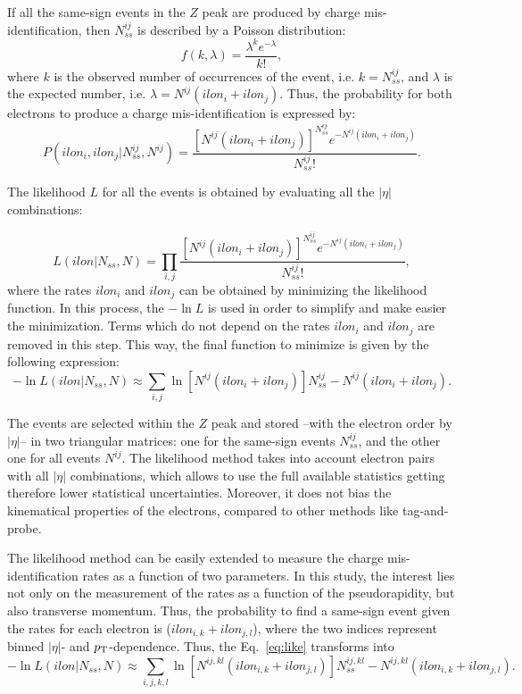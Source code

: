 If all the same-sign events in the $Z$ peak are produced by charge mis-identification, then $N^{ij}_{ss}$ is described by a Poisson distribution:
\begin{equation}
f(k,\lambda)=\frac{\lambda^k e^{-\lambda}}{k!},
\end{equation}
where $k$ is the observed number of occurrences of the event, i.e. $k=N^{ij}_{ss}$, and $\lambda$ is the expected number,  i.e. $\lambda=N^{ij}(ilon_i+ilon_j)$. Thus, the probability for both electrons to produce a charge mis-identification is expressed by:
\begin{equation}
P(ilon_i,ilon_j|N^{ij}_{ss},N^{ij})=\frac{[N^{ij}(ilon_i+ilon_j)]^{N_{ss}^{ij}}e^{-N^{ij}(ilon_i+ilon_j)}}{N^{ij}_{ss}!}.
\end{equation}

The likelihood $L$ for all the events is obtained by evaluating all the $|\eta|$ combinations:

\begin{equation}
L(ilon|N_{ss},N)=\prod_{i,j}\frac{[N^{ij}(ilon_i+ilon_j)]^{N_{ss}^{ij}}e^{-N^{ij}(ilon_i+ilon_j)}}{N^{ij}_{ss}!},
\end{equation}
where the rates $ilon_i$ and $ilon_j$ can be obtained by minimizing the likelihood function. In this process, the $-\ln L$ is used in order to simplify and make easier the minimization. Terms which do not depend on the rates $ilon_i$ and $ilon_j$ are removed in this step. This way, the final function to minimize is given by the following expression:
\begin{equation}
\label{eq:like}
-\ln L(ilon|N_{ss},N)\approx \sum_{i,j}\ln[N^{ij}(ilon_i+ilon_j)]N^{ij}_{ss}-N^{ij}(ilon_i+ilon_j).
\end{equation}

The events are selected within the $Z$ peak and stored --with the electron order by $|\eta|$-- in two triangular matrices: one for the same-sign events $N^{ij}_{ss}$,  and the other one for all events $N^{ij}$. The likelihood method takes into account
electron pairs with all $|\eta|$ combinations, which allows to use the full available statistics  getting therefore lower statistical uncertainties. Moreover, it does not bias the kinematical properties of the
electrons, compared to other methods like tag-and-probe.

The likelihood  method can be easily extended to measure the charge mis-identification rates as a function of  two parameters. In this study, the interest lies not only on the measurement of the rates   as a function of the pseudorapidity, but also transverse momentum. Thus, the probability to find a same-sign event given the rates for each electron is ($ilon_{i,k}+ilon_{j,l}$), where the two indices represent binned $|\eta|$- and $p_{\rm T}$-dependence. Thus, the Eq.~\ref{eq:like} transforms into
\begin{equation}
-\ln L(ilon|N_{ss},N)\approx \sum_{i,j,k,l}\ln[N^{ij,kl}(ilon_{i,k}+ilon_{j,l})]N^{ij,kl}_{ss}-N^{ij,kl}(ilon_{i,k}+ilon_{j,l}).
\end{equation}   

